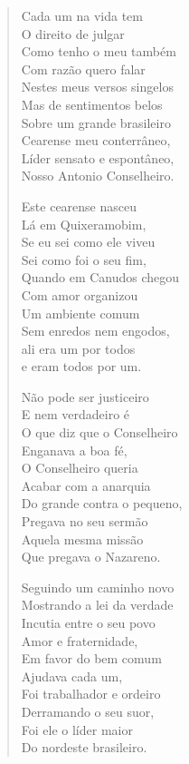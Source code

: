 \begin{verse}
Cada um na vida tem\\
O direito de julgar\\
Como tenho o meu também\\
Com razão quero falar\\
Nestes meus versos singelos\\
Mas de sentimentos belos\\
Sobre um grande brasileiro\\
Cearense meu conterrâneo,\\
Líder sensato e espontâneo,\\
Nosso Antonio Conselheiro.

Este cearense nasceu\\
Lá em Quixeramobim,\\
Se eu sei como ele viveu\\
Sei como foi o seu fim,\\
Quando em Canudos chegou\\
Com amor organizou\\
Um ambiente comum\\
Sem enredos nem engodos,\\
ali era um por todos\\
e eram todos por um.

Não pode ser justiceiro\\
E nem verdadeiro é\\
O que diz que o Conselheiro\\
Enganava a boa fé,\\
O Conselheiro queria\\
Acabar com a anarquia\\
Do grande contra o pequeno,\\
Pregava no seu sermão\\
Aquela mesma missão\\
Que pregava o Nazareno.

Seguindo um caminho novo\\
Mostrando a lei da verdade\\
Incutia entre o seu povo\\
Amor e fraternidade,\\
Em favor do bem comum\\
Ajudava cada um,\\
Foi trabalhador e ordeiro\\
Derramando o seu suor,\\
Foi ele o líder maior\\
Do nordeste brasileiro.


\end{verse}
